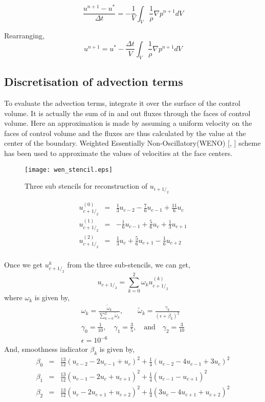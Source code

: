 \begin{equation}
 \frac{u^{n+1}-u^*}{\Delta t} = -\frac{1}{V}\int_V\frac{1}{\rho}\nabla  p^{n+1} dV
\end{equation}

Rearranging,
\begin{equation}
 u^{n+1} = u^*-\frac{\Delta t}{V}\int_V\frac{1}{\rho}\nabla  p^{n+1} dV
\end{equation}

\subsection{Discretisation of advection terms}
To evaluate the advection terms, integrate it over the surface of the control volume. It is actually the sum of in and out fluxes through the faces of control volume. 
Here an approximation is made by assuming a uniform velocity on the faces of control volume and the fluxes are thus calculated by the value at the center of the boundary. 
Weighted Essentially Non-Oscillatory(WENO) [\cite{liu1994weighted}, \cite{jiang1995efficient}] scheme has been used to approximate the values of velocities at the face centers.
\begin{figure}
 \centering
 \texttt{[image: wen\_stencil.eps]}
 \caption{Three sub stencils for reconstruction of $u_{i+1/_2}$}
\end{figure}

\begin{eqnarray*}
u^{(0)}_{c+1/_2} &=& \frac{1}{3}u_{c-2} - \frac{7}{6}u_{c-1} + \frac{11}{6} u_{c} \\
u^{(1)}_{c+1/_2} &=& -\frac{1}{6}u_{c-1} + \frac{5}{6}u_{c} + \frac{1}{3}u_{c+1} \\
u^{(2)}_{c+1/_2} &=& \frac{1}{3}u_{c} + \frac{5}{6}u_{c+1} − \frac{1}{6}u_{c+2} \\
\end{eqnarray*}

Once we get $u^{k}_{c+1/_2}$ from the three sub-stencils, we can get,
\begin{equation}
 u_{c+1/_2} = \sum_{k=0}^2 \omega_k u^{(k)}_{c+1/_2} %
\end{equation}
where $\omega_k$ is given by,
\begin{eqnarray*}
 \omega_k = \frac{\tilde\omega_k}{\sum_{k=0}^2 \tilde\omega_k}, \qquad
 \tilde\omega_k = \frac{\gamma_k}{(\epsilon+\beta_k)^2} \\
 \gamma_0 = \frac{1}{10}, \quad \gamma_1 = \frac{3}{5}, \quad\text{and}\quad \gamma_2 = \frac{3}{10} \\
  \epsilon = 10^{-6}
\end{eqnarray*}
And, smoothness indicator $\beta_k$ is given by,
\begin{eqnarray*}
\beta_0 &=& \frac{13}{12}(u_{c-2} - 2u_{c-1} + u_c)^2 + \frac{1}{4}(u_{c-2}-4u_{c-1}+3u_c)^2\\
\beta_1 &=& \frac{13}{12}(u_{c-1} - 2u_{c} + u_{c+1})^2 + \frac{1}{4}(u_{c-1}-u_{c+1})^2\\
 \beta_2 &=& \frac{13}{12}(u_{c} - 2u_{c+1} + u_{c+2})^2 + \frac{1}{4}(3u_{c}-4u_{c+1}+u_{c+2})^2\\
\end{eqnarray*}

